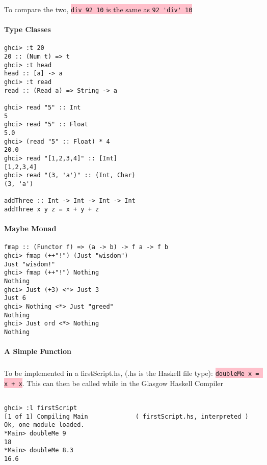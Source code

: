 \documentclass{article}
\begin{document}
To compare the two, \colorbox{pink}{ \lstinline{div 92 10} is the same as \lstinline{92 'div' 10}}

\paragraph{Type Classes}

\begin{lstlisting}
ghci> :t 20
20 :: (Num t) => t 
ghci> :t head  
head :: [a] -> a  
ghci> :t read  
read :: (Read a) => String -> a  

ghci> read "5" :: Int  
5  
ghci> read "5" :: Float  
5.0  
ghci> (read "5" :: Float) * 4  
20.0  
ghci> read "[1,2,3,4]" :: [Int]  
[1,2,3,4]  
ghci> read "(3, 'a')" :: (Int, Char)  
(3, 'a')

addThree :: Int -> Int -> Int -> Int  
addThree x y z = x + y + z  
\end{lstlisting}

\break

\paragraph{Maybe Monad}

\begin{lstlisting}
fmap :: (Functor f) => (a -> b) -> f a -> f b  
ghci> fmap (++"!") (Just "wisdom")  
Just "wisdom!"  
ghci> fmap (++"!") Nothing  
Nothing  
ghci> Just (+3) <*> Just 3  
Just 6  
ghci> Nothing <*> Just "greed"  
Nothing  
ghci> Just ord <*> Nothing  
Nothing  
\end{lstlisting}

\paragraph{A Simple Function}

\subparagraph{}

To be implemented in a firstScript.hs, (.hs is the Haskell file type): \colorbox{pink}{ \lstinline{doubleMe x = x + x}}. This can then be called while in the Glasgow Haskell Compiler

\begin{lstlisting}

ghci> :l firstScript
[1 of 1] Compiling Main             ( firstScript.hs, interpreted )
Ok, one module loaded.
*Main> doubleMe 9
18
*Main> doubleMe 8.3
16.6

\end{lstlisting}

\hfill \break
\end{document}
